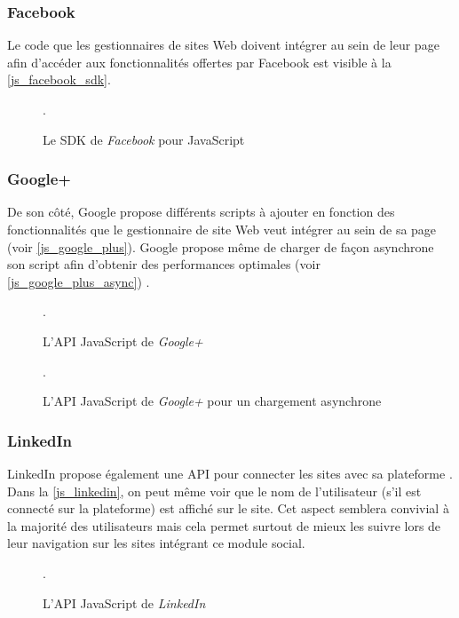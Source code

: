 \subsubsection{Facebook}
Le code que les gestionnaires de sites Web doivent intégrer au sein de leur page afin d'accéder aux fonctionnalités offertes par Facebook \cite{javascript_facebook_sdk} est visible à la \autoref{js_facebook_sdk}.

\begin{figure}[h]
	\centering
	
	\caption{\label{js_facebook_sdk}Le SDK de \textit{Facebook} pour JavaScript}.
\end{figure}

\subsubsection{Google+}
De son côté, Google propose différents scripts à ajouter en fonction des fonctionnalités que le gestionnaire de site Web veut intégrer au sein de sa page (voir \autoref{js_google_plus}). Google propose même de charger de façon asynchrone son script afin d'obtenir des performances optimales (voir \autoref{js_google_plus_async}) \cite{javascript_google_plus}.

\begin{figure}[h]
	\centering
	
	\caption{\label{js_google_plus}L'API JavaScript de \textit{Google+}}.
\end{figure}

\begin{figure}[h]
	\centering
	
	\caption{\label{js_google_plus_async}L'API JavaScript de \textit{Google+} pour un chargement asynchrone}.
\end{figure}

\subsubsection{LinkedIn}
LinkedIn propose également une API pour connecter les sites avec sa plateforme \cite{javascript_linkedin}. Dans la \autoref{js_linkedin}, on peut même voir que le nom de l'utilisateur (s'il est connecté sur la plateforme) est affiché sur le site. Cet aspect semblera convivial à la majorité des utilisateurs mais cela permet surtout de mieux les suivre lors de leur navigation sur les sites intégrant ce module social.

\begin{figure}[h]
	\centering
	
	\caption{\label{js_linkedin}L'API JavaScript de \textit{LinkedIn}}.
\end{figure}

